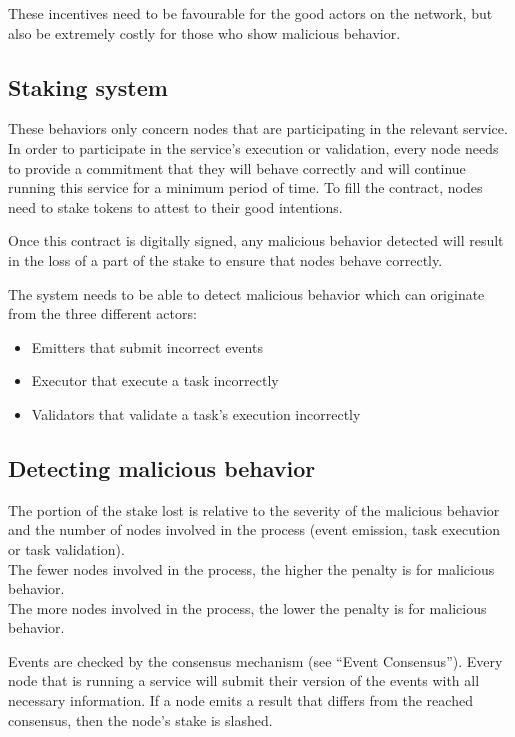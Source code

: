 \documentclass{article}
\begin{document}
These incentives need to be favourable for the good actors on the network, but also be extremely costly for those who show malicious behavior.

\subsection{Staking system}

These behaviors only concern nodes that are participating in the relevant service. In order to participate in the service’s execution or validation, every node needs to provide a commitment that they will behave correctly and will continue running this service for a minimum period of time. To fill the contract, nodes need to stake tokens to attest to their good intentions. 

Once this contract is digitally signed, any malicious behavior detected will result in the loss of a part of the stake to ensure that nodes behave correctly.

The system needs to be able to detect malicious behavior which can originate from the three different actors:

\begin{itemize}
\item Emitters that submit incorrect events
\item Executor that execute a task incorrectly
\item Validators that validate a task’s execution incorrectly
\end{itemize}

\subsection{Detecting malicious behavior}

The portion of the stake lost is relative to the severity of the malicious behavior and the number of nodes involved in the process (event emission, task execution or task validation).
\\
The fewer nodes involved in the process, the higher the penalty is for malicious behavior.
\\
The more nodes involved in the process, the lower the penalty is for malicious behavior.

Events are checked by the consensus mechanism (see “Event Consensus”). Every node that is running a service will submit their version of the events with all necessary information. If a node emits a result that differs from the reached consensus, then the node’s stake is slashed.
\end{document}
